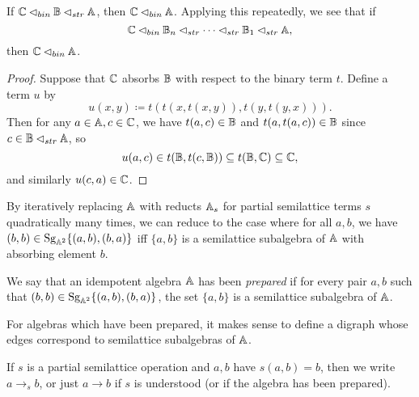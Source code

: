 \documentclass[letterpaper,11pt]{article}
\DeclareMathOperator{\Sg}{Sg}
\begin{document}
\begin{prop} If $\mathbb{C} \lhd_{bin} \mathbb{B} \lhd_{str} \mathbb{A}$, then $\mathbb{C} \lhd_{bin} \mathbb{A}$. Applying this repeatedly, we see that if
\[
\mathbb{C} \lhd_{bin} \mathbb{B}_n \lhd_{str} \cdots \lhd_{str} \mathbb{B}_1 \lhd_{str} \mathbb{A},
\]
then $\mathbb{C} \lhd_{bin} \mathbb{A}$.
\end{prop}
\begin{proof} Suppose that $\mathbb{C}$ absorbs $\mathbb{B}$ with respect to the binary term $t$. Define a term $u$ by
\[
u(x,y) \coloneqq t(t(x,t(x,y)),t(y,t(y,x))).
\]
Then for any $a \in \mathbb{A}, c \in \mathbb{C}$, we have $t(a,c) \in \mathbb{B}$ and $t(a,t(a,c)) \in \mathbb{B}$ since $c \in \mathbb{B} \lhd_{str} \mathbb{A}$, so
\[
u(a,c) \in t(\mathbb{B},t(c,\mathbb{B})) \subseteq t(\mathbb{B},\mathbb{C}) \subseteq \mathbb{C},
\]
and similarly $u(c,a) \in \mathbb{C}$.
\end{proof}

By iteratively replacing $\mathbb{A}$ with reducts $\mathbb{A}_s$ for partial semilattice terms $s$ quadratically many times, we can reduce to the case where for all $a,b$, we have $(b,b) \in \Sg_{\bA^2}\{(a,b),(b,a)\}$ iff $\{a,b\}$ is a semilattice subalgebra of $\mathbb{A}$ with absorbing element $b$.

\begin{defn}\label{defn-prepared} We say that an idempotent algebra $\mathbb{A}$ has been \emph{prepared} if for every pair $a,b$ such that $(b,b) \in \Sg_{\bA^2}\{(a,b),(b,a)\}$, the set $\{a,b\}$ is a semilattice subalgebra of $\mathbb{A}$.%
\end{defn}

For algebras which have been prepared, it makes sense to define a digraph whose edges correspond to semilattice subalgebras of $\mathbb{A}$.

\begin{defn} If $s$ is a partial semilattice operation and $a,b$ have $s(a,b) = b$, then we write $a \rightarrow_s b$, or just $a \rightarrow b$ if $s$ is understood (or if the algebra has been prepared).
\end{defn}
\end{document}

